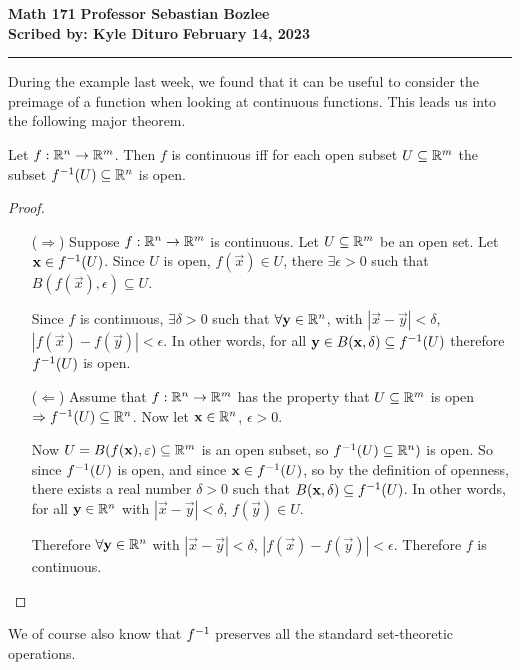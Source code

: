 \documentclass[12pt, twosided]{article}
\begin{document}
\noindent \textbf{Math 171} \hfill \textbf{Professor Sebastian Bozlee} \\
\textbf{Scribed by: Kyle Dituro} \hfill \textbf{February 14, 2023}\hrule
\vspace{.2in}

During the example last week, we found that it can be useful to consider the preimage of a function when looking at continuous functions. This leads us into the following major theorem.

\begin{thm}
  Let \(f: \mathbb{R}^n \to \mathbb{R}^m\). Then \(f\) is continuous iff for each open subset \(U \subseteq \mathbb{R}^m\) the subset \(f^{-1}(U)\subseteq \mathbb{R}^n\) is open.
\end{thm}
\begin{proof}
  \begin{enumerate}
  \item [(\(\Rightarrow\))] Suppose \(f: \mathbb{R}^n \to \mathbb{R}^m\) is continuous. Let \(U \subseteq \mathbb{R}^m\) be an open set. Let \(\mathbf{x} \in f^{-1}(U)\). Since \(U\) is open, \(f(\vec{x}) \in U\), there \(\exists \epsilon > 0\) such that \(B(f(\vec{x}), \epsilon) \subseteq U\).

    Since \(f\) is continuous, \(\exists \delta > 0\) such that \(\forall \mathbf{y} \in \mathbb{R}^n\), with \(|\vec{x} - \vec{y}| < \delta\), \(|f(\vec{x}) - f(\vec{y})| < \epsilon\). In other words, for all \(\mathbf{y} \in B(\mathbf{x}, \delta) \subseteq f^{-1}(U)\) therefore \(f^{-1}(U)\) is open.
  \item [(\(\Leftarrow\))] Assume that \(f: \mathbb{R}^n \to \mathbb{R}^m\) has the property that \(U \subseteq \mathbb{R}^m\) is open \(\Rightarrow f^{-1}(U) \subseteq \mathbb{R}^n\). Now let \(\mathbf{x} \in \mathbb{R}^n\), \(\epsilon > 0\).

    Now \(U = B(f(\mathbf{x}), \varepsilon) \subseteq \mathbb{R}^m\) is an open subset, so \(f^{-1}(U) \subseteq \mathbb{R}^n)\) is open. So since \(f^{-1}(U)\) is open, and since \(\mathbf{x} \in f^{-1}(U)\), so by the definition of openness, there exists a real number \(\delta > 0\) such that \(B(\mathbf{x}, \delta) \subseteq f^{-1}(U)\). In other words, for all \(\mathbf{y} \in \mathbb{R}^n\) with \(|\vec{x} - \vec{y}| < \delta\), \(f(\vec{y}) \in U\).

    Therefore \(\forall \mathbf{y} \in \mathbb{R}^n\) with \(|\vec{x} - \vec{y}| < \delta\), \(|f(\vec{x}) - f(\vec{y})| < \epsilon\). Therefore \(f\) is continuous.
  \end{enumerate}
\end{proof}

We of course also know that \(f^{-1}\) preserves all the standard set-theoretic operations.
\end{document}
